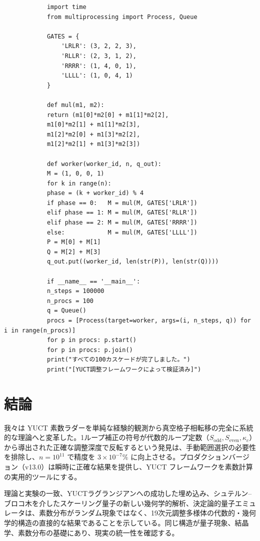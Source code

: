 \documentclass[11pt,a4paper]{article}
\newcommand{\kappac}{\kappa_c}
\newcommand{\Sodd}{S_{\mathrm{odd}}}
\newcommand{\Seven}{S_{\mathrm{even}}}
\begin{document}
	\begin{tcolorbox}[title=並列カスケードベンチマーク（Python）, breakable]
		\begin{lstlisting}
			import time
			from multiprocessing import Process, Queue
			
			GATES = {
				'LRLR': (3, 2, 2, 3),
				'RLLR': (2, 3, 1, 2),
				'RRRR': (1, 4, 0, 1),
				'LLLL': (1, 0, 4, 1)
			}
			
			def mul(m1, m2):
			return (m1[0]*m2[0] + m1[1]*m2[2],
			m1[0]*m2[1] + m1[1]*m2[3],
			m1[2]*m2[0] + m1[3]*m2[2],
			m1[2]*m2[1] + m1[3]*m2[3])
			
			def worker(worker_id, n, q_out):
			M = (1, 0, 0, 1)
			for k in range(n):
			phase = (k + worker_id) % 4
			if phase == 0:   M = mul(M, GATES['LRLR'])
			elif phase == 1: M = mul(M, GATES['RLLR'])
			elif phase == 2: M = mul(M, GATES['RRRR'])
			else:            M = mul(M, GATES['LLLL'])
			P = M[0] + M[1]
			Q = M[2] + M[3]
			q_out.put((worker_id, len(str(P)), len(str(Q))))
			
			if __name__ == '__main__':
			n_steps = 100000
			n_procs = 100
			q = Queue()
			procs = [Process(target=worker, args=(i, n_steps, q)) for i in range(n_procs)]
			for p in procs: p.start()
			for p in procs: p.join()
			print("すべての100カスケードが完了しました。")
			print("[YUCT調整フレームワークによって検証済み]")
		\end{lstlisting}
	\end{tcolorbox}
	
	\section{結論}
	\label{sec:conclusion}
	我々は YUCT 素数ラダーを単純な経験的観測から真空格子相転移の完全に系統的な理論へと変革した。1ループ補正の符号が代数的ループ定数（\(\Sodd,\Seven,\kappac\)）から導出された正確な調整深度で反転するという発見は、手動範囲選択の必要性を排除し、\(n=10^{11}\) で精度を \(3\times10^{-7}\%\) に向上させる。プロダクションバージョン（v13.0）は瞬時に正確な結果を提供し、YUCT フレームワークを素数計算の実用的ツールにする。
	
	理論と実験の一致、YUCTラグランジアンへの成功した埋め込み、シュテルン–ブロコ木を介したスケーリング量子の新しい幾何学的解析、決定論的量子エミュレータは、素数分布がランダム現象ではなく、19次元調整多様体の代数的・幾何学的構造の直接的な結果であることを示している。同じ構造が量子現象、結晶学、素数分布の基礎にあり、現実の統一性を確認する。
	
\end{document}
